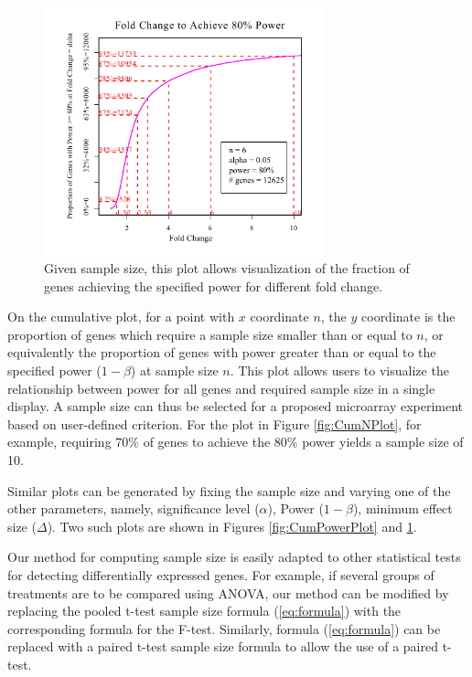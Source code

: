 \documentclass{bioinfo}
\begin{document}
\begin{figure}[h]
  \centerline{\includegraphics*[width=3.2in]{CumFoldChangePlotP.pdf}}
  \caption[Given Sample Size, Fold Change (Effect Size) Necessary to
    Achieving a Specified Power]{Given sample size, this plot allows visualization of the fraction of genes achieving the specified power for different fold change.}
  \label{fig:CumFoldChangePlot}
\end{figure}

On the cumulative plot, for a point with $x$ coordinate $n$, the
$y$ coordinate is the proportion of genes which require a sample
size smaller than or equal to $n$, or equivalently the proportion
of genes with power greater than or equal to the specified power
($1-\beta$) at sample size $n$. This plot allows users to
visualize the relationship between power for all genes and
required sample size in a single display.  A sample size can thus
be selected for a proposed microarray experiment based on
user-defined criterion. For the plot in Figure \ref{fig:CumNPlot},
for example, requiring $70\%$ of genes to achieve the $80\%$ power
yields a sample size of 10.

Similar plots can be generated by fixing the sample size and
varying one of the other parameters, namely, significance level
($\alpha$), Power ($1-\beta$), minimum effect size ($\Delta$). Two
such plots are shown in Figures \ref{fig:CumPowerPlot} and
\ref{fig:CumFoldChangePlot}.

Our method for computing sample size is easily adapted to other
statistical tests for detecting differentially expressed genes. For
example, if several groups of treatments are to be compared using
ANOVA, our method can be modified by replacing the pooled t-test
sample size formula (\ref{eq:formula}) with the corresponding
formula for the F-test. Similarly, formula (\ref{eq:formula}) can be
replaced with a paired t-test sample size formula to allow the use
of a paired t-test.
\end{document}
